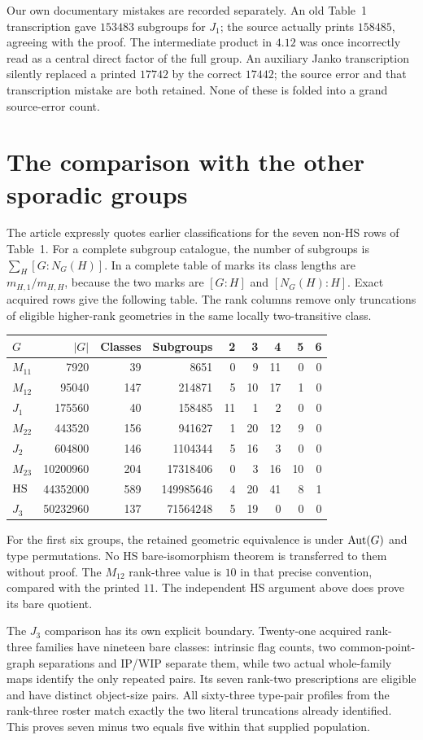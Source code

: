 Our own documentary mistakes are recorded separately. An old Table~1
transcription gave $153483$ subgroups for $J_1$; the source actually prints
$158485$, agreeing with the proof. The intermediate product in $4.12$
was once incorrectly read as a central direct factor of the full group.
An auxiliary Janko transcription silently replaced a printed $17742$
by the correct $17442$; the source error and that transcription mistake
are both retained. None of these is folded into a grand source-error
count.

\section{The comparison with the other sporadic groups}\label{comparison}
The article expressly quotes earlier classifications for the seven
non-HS rows of Table~1. For a complete subgroup catalogue, the number
of subgroups is $\sum_H[G:N_G(H)]$. In a complete table of marks its
class lengths are $m_{H,1}/m_{H,H}$, because the two marks are
$[G:H]$ and $[N_G(H):H]$. Exact acquired rows give the following table.
The rank columns remove only truncations of eligible higher-rank
geometries in the same locally two-transitive class.
\begin{center}\small
\begin{tabular}{lrrr|rrrrr}\toprule
$G$&$|G|$&Classes&Subgroups&2&3&4&5&6\\\midrule
$M_{11}$&7920&39&8651&0&9&11&0&0\\
$M_{12}$&95040&147&214871&5&10&17&1&0\\
$J_1$&175560&40&158485&11&1&2&0&0\\
$M_{22}$&443520&156&941627&1&20&12&9&0\\
$J_2$&604800&146&1104344&5&16&3&0&0\\
$M_{23}$&10200960&204&17318406&0&3&16&10&0\\
$\mathrm{HS}$&44352000&589&149985646&4&20&41&8&1\\
$J_3$&50232960&137&71564248&5&19&0&0&0\\\bottomrule
\end{tabular}
\end{center}
For the first six groups, the retained geometric equivalence is under
$\operatorname{Aut}(G)$ and type permutations. No HS bare-isomorphism theorem is
transferred to them without proof. The $M_{12}$ rank-three value is
$10$ in that precise convention, compared with the printed $11$.
The independent HS argument above does prove its bare quotient.

The $J_3$ comparison has its own explicit boundary. Twenty-one acquired
rank-three families have nineteen bare classes: intrinsic flag counts,
two common-point-graph separations and IP/WIP separate them, while two
actual whole-family maps identify the only repeated pairs. Its seven
rank-two prescriptions are eligible and have distinct object-size pairs.
All sixty-three type-pair profiles from the rank-three roster match
exactly the two literal truncations already identified. This proves
seven minus two equals five within that supplied population.

